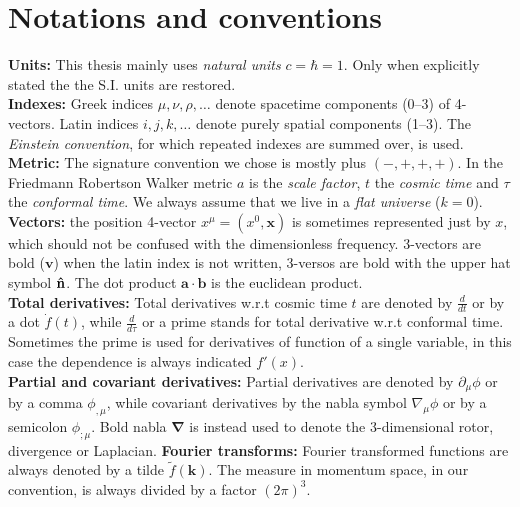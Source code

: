 \section*{Notations and conventions}
\vspace*{\fill}
\textbf{Units:} This thesis mainly uses \emph{natural units} $c=\hbar=1$. Only when explicitly stated the the S.I. units are restored.\\  
\textbf{Indexes:} Greek indices $\mu,\nu,\rho,\dots$ denote spacetime components (0--3) of 4-vectors. Latin indices $i,j,k,\dots$ denote purely spatial components (1--3). The \emph{Einstein convention}, for which repeated indexes are summed over, is used. \\
\textbf{Metric:} The signature convention we chose is mostly plus $(-,+,+,+)$. In the Friedmann Robertson Walker metric $a$ is the \emph{scale factor}, $t$ the \emph{cosmic time} and $\tau$ the \emph{conformal time}. We always assume that we live in a \emph{flat universe} ($k=0$).\\
\textbf{Vectors:} the position 4-vector $x^\mu=(x^0,\mathbf x)$ is sometimes represented just by $x$, which should not be confused with the dimensionless frequency. 3-vectors are bold ($\mathbf v$) when the latin index is not written, 3-versos are bold with the upper hat symbol $\mathbf{\hat{n}}$. The dot product $\mathbf{a\cdot b}$ is the euclidean product. \\
\textbf{Total derivatives:} Total derivatives w.r.t cosmic time $t$ are denoted by $\tfrac d{dt}$ or by a dot $\dot f(t)$, while $\tfrac d{d\tau}$ or a prime stands for total derivative w.r.t conformal time. Sometimes the prime is used for derivatives of function of a single variable, in this case the dependence is always indicated $f'(x)$.\\
\textbf{Partial and covariant derivatives:} Partial derivatives are denoted by $\partial_\mu\phi$ or by a comma $\phi_{,\mu}$, while covariant derivatives by the nabla symbol $\nabla_\mu\phi$ or by a semicolon $\phi_{;\mu}$. Bold nabla $\boldsymbol\nabla$ is instead used to denote the 3-dimensional rotor, divergence or Laplacian.
\textbf{Fourier transforms:} Fourier transformed functions are always denoted by a tilde $\tilde f(\mathbf k)$. The measure in momentum space, in our convention, is always divided by a factor $(2\pi)^3$.  